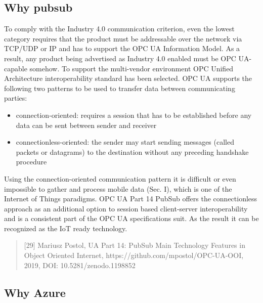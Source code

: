 \documentclass[
]{article}
\providecommand{\tightlist}{%
  \setlength{\itemsep}{0pt}\setlength{\parskip}{0pt}}
\begin{document}
\hypertarget{why-pubsub}{%
\subsection{Why pubsub}\label{why-pubsub}}

To comply with the Industry 4.0 communication criterion, even the lowest
category requires that the product must be addressable over the network
via TCP/UDP or IP and has to support the OPC UA Information Model. As a
result, any product being advertised as Industry 4.0 enabled must be OPC
UA-capable somehow. To support the multi-vendor environment OPC Unified
Architecture interoperability standard has been selected. OPC UA
supports the following two patterns to be used to transfer data between
communicating parties:

\begin{itemize}
\tightlist
\item
  connection-oriented: requires a session that has to be established
  before any data can be sent between sender and receiver
\item
  connectionless-oriented: the sender may start sending messages (called
  packets or datagrams) to the destination without any preceding
  handshake procedure
\end{itemize}

Using the connection-oriented communication pattern it is difficult or
even impossible to gather and process mobile data (Sec. I), which is one
of the Internet of Things paradigms. OPC UA Part 14 PubSub offers the
connectionless approach as an additional option to session based
client-server interoperability and is a consistent part of the OPC UA
specifications suit. As the result it can be recognized as the IoT ready
technology.

\begin{quote}
{[}29{]} Mariusz Postol, UA Part 14: PubSub Main Technology Features in
Object Oriented Internet, https://github.com/mpostol/OPC-UA-OOI, 2019,
DOI: 10.5281/zenodo.1198852
\end{quote}

\hypertarget{why-azure}{%
\subsection{Why Azure}\label{why-azure}}
\end{document}
